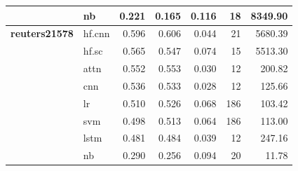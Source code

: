 \documentclass[final]{clv2025}
\begin{document}
\begin{table}[h!]
{\begin{tabular}{@{}p{2cm}p{1.2cm}rrrrr@{}}
 & nb & 0.221 & 0.165 & 0.116 & 18 & 8349.90 \\
\midrule
\textbf{reuters21578} & hf.cnn & 0.596 & 0.606 & 0.044 & 21 & 5680.39 \\
 & hf.sc & 0.565 & 0.547 & 0.074 & 15 & 5513.30 \\
 & attn & 0.552 & 0.553 & 0.030 & 12 & 200.82 \\
 & cnn & 0.536 & 0.533 & 0.028 & 12 & 125.66 \\
 & lr & 0.510 & 0.526 & 0.068 & 186 & 103.42 \\
 & svm & 0.498 & 0.513 & 0.064 & 186 & 113.00 \\
 & lstm & 0.481 & 0.484 & 0.039 & 12 & 247.16 \\
 & nb & 0.290 & 0.256 & 0.094 & 20 & 11.78 \\
\bottomrule
\end{tabular}%
}
\end{table}
\end{document}
